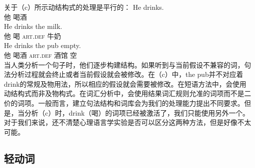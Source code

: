 \begin{exe}
\begin{xlist}[iv.]
\begin{exe}
\begin{xlist}[iv.]
关于（c）所示动结构式的处理是平行的：
\eal
\ex
\gll He drinks.\\
     他 喝酒\\
\ex
\gll He drinks the milk.\\
     他 喝 \textsc{art}.\textsc{def} 牛奶\\
\ex
\gll He drinks the pub empty.\\
     他 喝酒 \textsc{art}.\textsc{def} 酒馆 空\\
\zl
当人类分析一个句子时，他们逐步构建结构。如果听到与当前假设不兼容的词，句法分析过程就会终止或者当前假设就会被修改。在（c）中，the pub并不对应着drink的常规及物用法，所以相应的假设就会需要被修改。在短语方法中，会使用动结构式而非及物构式。在词汇分析中，会使用结果词汇规则允准的词项而不是二价的词项。一般而言，建立句法结构和词库会为我们的处理能力提出不同要求。但是，当分析（c）时，drink（喝）的词项已经被激活了，我们只能使用另外一个。对于我们来说，还不清楚心理语言学实验是否可以区分这两种方法，但是好像不太可能。

\subsection{轻动词}
\label{sec-psycho-lv}


\end{xlist}
\end{exe}
\end{xlist}
\end{exe}
